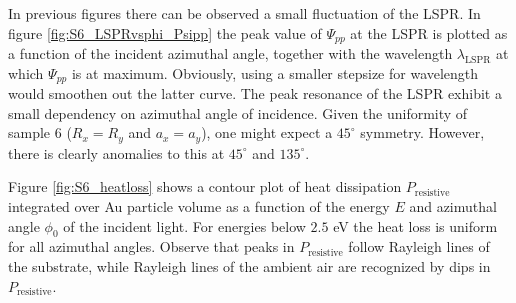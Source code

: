 In previous figures there can be observed a small fluctuation of the LSPR. In figure \ref{fig:S6_LSPRvsphi_Psipp} the peak value of $\Psi_{pp}$ at the LSPR is plotted as a function of the incident azimuthal angle, together with the wavelength $\lambda_{\text{LSPR}}$ at which $\Psi_{pp}$ is at maximum. Obviously, using a smaller stepsize for wavelength would smoothen out the latter curve. The peak resonance of the LSPR exhibit a small dependency on azimuthal angle of incidence. Given the uniformity of sample 6 ($R_{x}=R_{y}$ and $a_x=a_y$), one might expect a $45^\circ$ symmetry. However, there is clearly anomalies to this at $45^\circ$ and $135^\circ$. 




Figure \ref{fig:S6_heatloss} shows a contour plot of heat dissipation $P_{\text{resistive}}$ integrated over Au particle volume as a function of the energy $E$ and azimuthal angle $\phi_0$ of the incident light. For energies below $2.5$ eV the heat loss is uniform for all azimuthal angles. Observe that peaks in $P_{\text{resistive}}$ follow Rayleigh lines of the substrate, while Rayleigh lines of the ambient air are recognized by dips in $P_{\text{resistive}}$.
